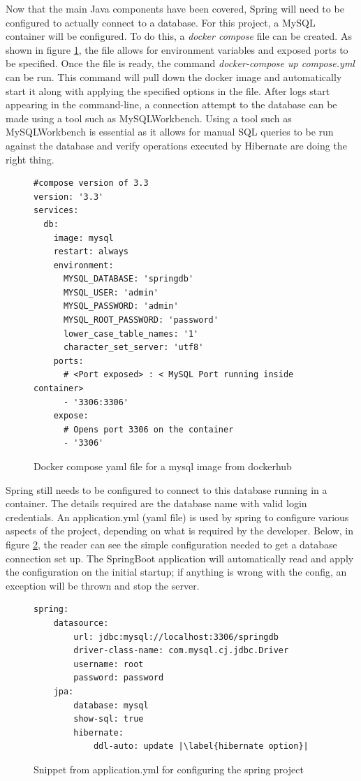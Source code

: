 Now that the main Java components have been covered, Spring will need to be configured to actually connect to a database.
For this project, a MySQL container will be configured. To do this, a \textit{docker compose} file can be created.
As shown in figure \ref{sqldocker}, the file allows for environment variables and exposed ports to be specified.
Once the file is ready, the command \textit{docker-compose up compose.yml} can be run.
This command will pull down the docker image and automatically start it along with applying the specified options in the file.
After logs start appearing in the command-line, a connection attempt to the database can be made using a tool such as MySQLWorkbench.
Using a tool such as MySQLWorkbench is essential as it allows for manual SQL queries to be run against the database and verify operations
executed by Hibernate are doing the right thing.


\begin{figure}[ht]
    \centering
    \begin{lstlisting}
#compose version of 3.3        
version: '3.3'
services:
  db:
    image: mysql
    restart: always
    environment:
      MYSQL_DATABASE: 'springdb'
      MYSQL_USER: 'admin'
      MYSQL_PASSWORD: 'admin'
      MYSQL_ROOT_PASSWORD: 'password'
      lower_case_table_names: '1'
      character_set_server: 'utf8'
    ports:
      # <Port exposed> : < MySQL Port running inside container>
      - '3306:3306'
    expose:
      # Opens port 3306 on the container
      - '3306'           
    \end{lstlisting}
    \caption{Docker compose yaml file for a mysql image from dockerhub}
    \label{sqldocker}
\end{figure}

Spring still needs to be configured to connect to this database running in a container.
The details required are the database name with valid login credentials.
An application.yml (yaml file) is used by spring to configure various aspects of the project, depending on what is required by the developer.
Below, in figure \ref{springymldbconfig}, the reader can see the simple configuration needed to get a database connection set up.
The SpringBoot application will automatically read and apply the configuration on the initial startup; if anything is wrong with the config,
an exception will be thrown and stop the server.

\begin{figure}[ht]
    \centering
    \begin{lstlisting}[escapechar=|]
spring:
    datasource:
        url: jdbc:mysql://localhost:3306/springdb
        driver-class-name: com.mysql.cj.jdbc.Driver
        username: root
        password: password
    jpa:
        database: mysql
        show-sql: true
        hibernate:
            ddl-auto: update |\label{hibernate option}|
    \end{lstlisting}
    \caption{Snippet from application.yml for configuring the spring project}
    \label{springymldbconfig}
\end{figure}

